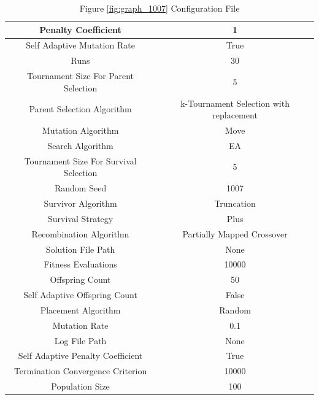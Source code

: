\documentclass{standalone}
\begin{document}
\begin{table}[!htb]
	\centering
	\caption{Figure \ref{fig:graph_1007} Configuration File}
	\label{tab:graph_1007}
	\begin{tabular}{| c | c |}
		\hline
		Penalty Coefficient		& 1		 \\
		\hline
		Self Adaptive Mutation Rate		& True		 \\
		\hline
		Runs		& 30		 \\
		\hline
		Tournament Size For Parent Selection		& 5		 \\
		\hline
		Parent Selection Algorithm		& k-Tournament Selection with replacement		 \\
		\hline
		Mutation Algorithm		& Move		 \\
		\hline
		Search Algorithm		& EA		 \\
		\hline
		Tournament Size For Survival Selection		& 5		 \\
		\hline
		Random Seed		& 1007		 \\
		\hline
		Survivor Algorithm		& Truncation		 \\
		\hline
		Survival Strategy		& Plus		 \\
		\hline
		Recombination Algorithm		& Partially Mapped Crossover		 \\
		\hline
		Solution File Path		& None		 \\
		\hline
		Fitness Evaluations		& 10000		 \\
		\hline
		Offspring Count		& 50		 \\
		\hline
		Self Adaptive Offspring Count		& False		 \\
		\hline
		Placement Algorithm		& Random		 \\
		\hline
		Mutation Rate		& 0.1		 \\
		\hline
		Log File Path		& None		 \\
		\hline
		Self Adaptive Penalty Coefficient		& True		 \\
		\hline
		Termination Convergence Criterion		& 10000		 \\
		\hline
		Population Size		& 100		 \\
		\hline
	\end{tabular}
\end{table}
\end{document}
